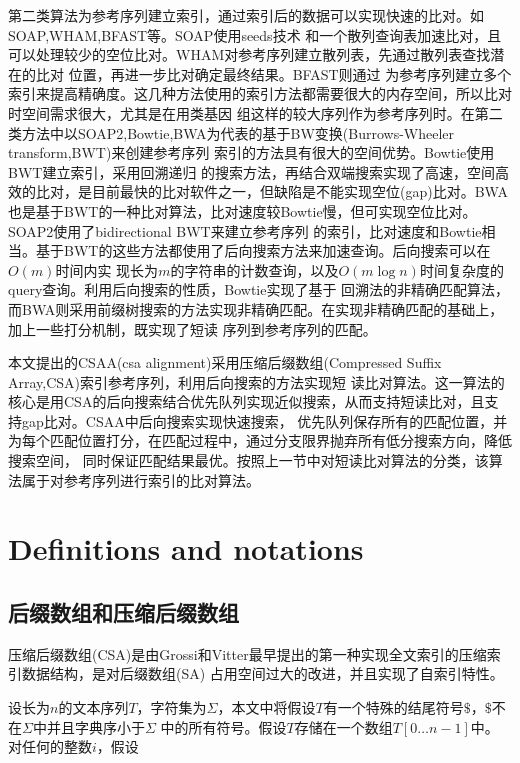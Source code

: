 \documentclass[UTF8,adobefonts]{ctexart}
\begin{document}
第二类算法为参考序列建立索引，通过索引后的数据可以实现快速的比对。如SOAP,WHAM,BFAST等。SOAP\cite{li2008soap}使用seeds技术
和一个散列查询表加速比对，且可以处理较少的空位比对。WHAM\cite{li2012wham}对参考序列建立散列表，先通过散列表查找潜在的比对
位置，再进一步比对确定最终结果。BFAST\cite{homer2009bfast}则通过
为参考序列建立多个索引来提高精确度。这几种方法使用的索引方法都需要很大的内存空间，所以比对时空间需求很大，尤其是在用类基因
组这样的较大序列作为参考序列时。在第二类方法中以SOAP2,Bowtie,BWA为代表的基于BW变换(Burrows-Wheeler transform,BWT)\cite{ferragina2005indexing}来创建参考序列
索引的方法具有很大的空间优势。Bowtie\cite{langmead2009ultrafast}使用BWT建立索引，采用回溯递归
的搜索方法，再结合双端搜索实现了高速，空间高效的比对，是目前最快的比对软件之一，但缺陷是不能实现空位(gap)比对。BWA\cite{li2009fast}
也是基于BWT的一种比对算法，比对速度较Bowtie慢，但可实现空位比对。SOAP2\cite{li2009soap2}使用了bidirectional BWT来建立参考序列
的索引，比对速度和Bowtie相当。基于BWT的这些方法都使用了后向搜索方法\cite{lippert2005space}来加速查询。后向搜索可以在$O(m)$时间内实
现长为$m$的字符串的计数查询，以及$O(m\log n)$时间复杂度的query查询。利用后向搜索的性质，Bowtie实现了基于
回溯法的非精确匹配算法，而BWA则采用前缀树搜索的方法实现非精确匹配。在实现非精确匹配的基础上，加上一些打分机制，既实现了短读
序列到参考序列的匹配。

本文提出的CSAA(csa alignment)采用压缩后缀数组(Compressed Suffix Array,CSA)\cite{grossi2005compressed}索引参考序列，利用后向搜索的方法实现短
读比对算法。这一算法的核心是用CSA的后向搜索结合优先队列实现近似搜索，从而支持短读比对，且支持gap比对。CSAA中后向搜索实现快速搜索，
优先队列保存所有的匹配位置，并为每个匹配位置打分，在匹配过程中，通过分支限界抛弃所有低分搜索方向，降低搜索空间，
同时保证匹配结果最优。按照上一节中对短读比对算法的分类，该算法属于对参考序列进行索引的比对算法。

\section{Definitions and notations}

\subsection{后缀数组和压缩后缀数组}
压缩后缀数组(CSA)是由Grossi和Vitter\cite{grossi2005compressed}最早提出的第一种实现全文索引的压缩索引数据结构，是对后缀数组(SA)
\cite{manber1993suffix}占用空间过大的改进，并且实现了自索引特性。

设长为$n$的文本序列$T$，字符集为$\Sigma$，本文中将假设$T$有一个特殊的结尾符号$\$$，$\$$不在$\Sigma$中并且字典序小于$\Sigma$
中的所有符号。假设$T$存储在一个数组$T[0\ldots n-1]$中。对任何的整数$i$，假设
\end{document}
